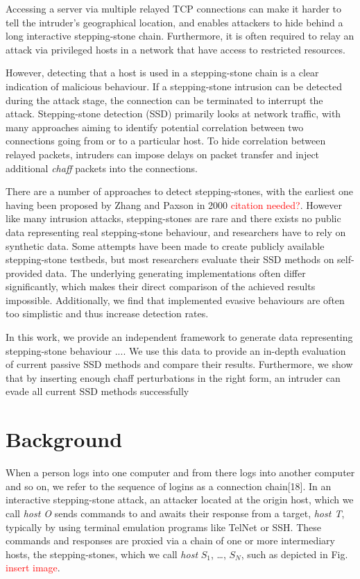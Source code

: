 \documentclass[conference]{IEEEtran}\usepackage[]{graphicx}\usepackage[]{color}
\begin{document}
Accessing a server via multiple relayed TCP connections can make it harder to tell the intruder's geographical location, and enables attackers to hide behind a long interactive stepping-stone chain. Furthermore, it is often required to relay an attack via privileged hosts in a network that have access to restricted resources. 

However, detecting that a host is used in a stepping-stone chain is a clear indication of malicious behaviour. If a stepping-stone intrusion can be detected during the attack stage, the connection can be terminated to interrupt the attack. Stepping-stone detection (SSD) primarily looks at network traffic, with many approaches aiming to identify potential correlation between two connections going from or to a particular host. To hide correlation between relayed packets, intruders can impose delays on packet transfer and inject additional \textit{chaff} packets into the connections.

There are a number of approaches to detect stepping-stones, with the earliest one having been proposed by Zhang and Paxson in 2000 \textcolor{red}{citation needed?}. However like many intrusion attacks, stepping-stones are rare and there exists no public data representing real stepping-stone behaviour, and researchers have to rely on synthetic data. Some attempts have been made to create publicly available stepping-stone testbeds, but most researchers evaluate their SSD methods on self-provided data. The underlying generating implementations often differ significantly, which makes their direct comparison of the achieved results impossible. Additionally, we find that implemented evasive behaviours are often too simplistic and thus increase detection rates. 

In this work, we provide an independent framework to generate data representing stepping-stone behaviour ....
We use this data to provide an in-depth evaluation of current passive SSD methods and compare their results. Furthermore, we show that by inserting enough chaff perturbations in the right form, an intruder can evade all current SSD methods successfully


\section{Background}

When a person logs into one computer and from there logs into another computer and so on, we refer to the sequence of logins as a connection chain[18]. 
In an interactive stepping-stone attack, an attacker located at the origin host, which we call \textit{host O} sends commands to and awaits their response from a target, \textit{host T}, typically by using terminal emulation programs like TelNet or SSH. These commands and responses are proxied via a chain of one or more intermediary hosts, the stepping-stones, which we call \textit{host} $S_1$, \dots, $S_N$, such as depicted in Fig. \textcolor{red}{insert image}. 
\end{document}
